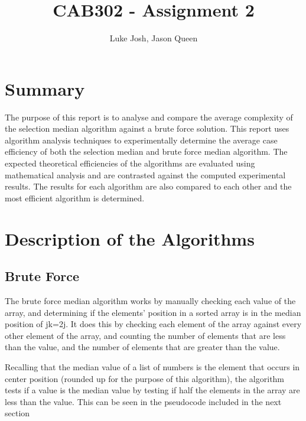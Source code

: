 \documentclass{article}
\title{CAB302 - Assignment 2}
\author{Luke Josh, Jason Queen}
\begin{document}

\maketitle
\tableofcontents

\section{Summary}
    The purpose of this report is to analyse and compare the average complexity of the selection median algorithm against a brute force solution. This report uses algorithm analysis techniques to experimentally determine the average case efficiency of both the selection median and brute force median algorithm. The expected theoretical efficiencies of the algorithms are evaluated using mathematical analysis and are contrasted against the computed experimental results. The results for each algorithm are also compared to each other and the most efficient algorithm is determined.

\section{Description of the Algorithms}
    \subsection{Brute Force}
        The brute force median algorithm works by manually checking each value of the array, and determining  if the elements’ position in a sorted array is in the median position of jk=2j. It does this by checking each element of the array against every other element of the array, and counting the number of elements that are less than the value, and the number of elements that are greater than the value.

        Recalling that the median value of a list of numbers is the element that occurs in center position (rounded up for the purpose of this algorithm), the algorithm tests if a value is the median value by testing if half the elements in the array are less than the value. This can be seen in the pseudocode included in the next section
\end{document}
